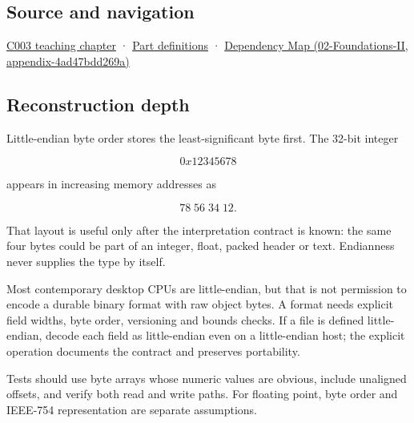 \subsection{Source and navigation}\label{appendix-367b6abf460e-source-and-navigation}

\hyperref[01-foundations-i-ch002-where-the-bytes-live]{C003 teaching chapter} · \hyperref[appendix-fd090d982a15-m003---parts-41-60]{Part definitions} · \href{../02-Foundations-II/main.pdf\#nameddest=appendix-4ad47bdd269a}{Dependency Map (02-Foundations-II, appendix-4ad47bdd269a)}

\subsection{Reconstruction depth}\label{appendix-367b6abf460e-reconstruction-depth}

Little-endian byte order stores the least-significant byte first. The 32-bit integer

\[
0x12345678
\]

appears in increasing memory addresses as

\[
78\;56\;34\;12.
\]

That layout is useful only after the interpretation contract is known: the same four bytes could be part of an integer, float, packed header or text. Endianness never supplies the type by itself.

Most contemporary desktop CPUs are little-endian, but that is not permission to encode a durable binary format with raw object bytes. A format needs explicit field widths, byte order, versioning and bounds checks. If a file is defined little-endian, decode each field as little-endian even on a little-endian host; the explicit operation documents the contract and preserves portability.

Tests should use byte arrays whose numeric values are obvious, include unaligned offsets, and verify both read and write paths. For floating point, byte order and IEEE-754 representation are separate assumptions.
